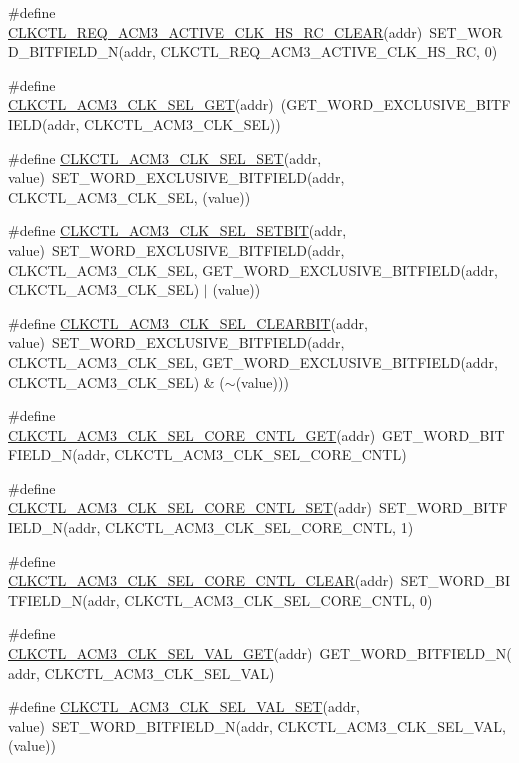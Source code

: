 \begin{DoxyCompactItemize}
\#define \hyperlink{a00544_a09d288add5f3f2bcd204e874b292084a}{CLKCTL\_\-REQ\_\-ACM3\_\-ACTIVE\_\-CLK\_\-HS\_\-RC\_\-CLEAR}(addr)~SET\_\-WORD\_\-BITFIELD\_\-N(addr, CLKCTL\_\-REQ\_\-ACM3\_\-ACTIVE\_\-CLK\_\-HS\_\-RC, 0)
\item 
\#define \hyperlink{a00544_a475e7d7345c6213e1e0074d4f1be33a5}{CLKCTL\_\-ACM3\_\-CLK\_\-SEL\_\-GET}(addr)~(GET\_\-WORD\_\-EXCLUSIVE\_\-BITFIELD(addr, CLKCTL\_\-ACM3\_\-CLK\_\-SEL))
\item 
\#define \hyperlink{a00544_a5db3846664ebb26bec7a6367928c72ad}{CLKCTL\_\-ACM3\_\-CLK\_\-SEL\_\-SET}(addr, value)~SET\_\-WORD\_\-EXCLUSIVE\_\-BITFIELD(addr, CLKCTL\_\-ACM3\_\-CLK\_\-SEL, (value))
\item 
\#define \hyperlink{a00544_aa5e0d7b946e296733391baac4cf7f70f}{CLKCTL\_\-ACM3\_\-CLK\_\-SEL\_\-SETBIT}(addr, value)~SET\_\-WORD\_\-EXCLUSIVE\_\-BITFIELD(addr, CLKCTL\_\-ACM3\_\-CLK\_\-SEL, GET\_\-WORD\_\-EXCLUSIVE\_\-BITFIELD(addr, CLKCTL\_\-ACM3\_\-CLK\_\-SEL) $|$ (value))
\item 
\#define \hyperlink{a00544_a07dac91bc32bc3f81ccb322bee4dfd0d}{CLKCTL\_\-ACM3\_\-CLK\_\-SEL\_\-CLEARBIT}(addr, value)~SET\_\-WORD\_\-EXCLUSIVE\_\-BITFIELD(addr, CLKCTL\_\-ACM3\_\-CLK\_\-SEL, GET\_\-WORD\_\-EXCLUSIVE\_\-BITFIELD(addr, CLKCTL\_\-ACM3\_\-CLK\_\-SEL) \& ($\sim$(value)))
\item 
\#define \hyperlink{a00544_a90d30141c0714f73c374ee1e77d4c05c}{CLKCTL\_\-ACM3\_\-CLK\_\-SEL\_\-CORE\_\-CNTL\_\-GET}(addr)~GET\_\-WORD\_\-BITFIELD\_\-N(addr, CLKCTL\_\-ACM3\_\-CLK\_\-SEL\_\-CORE\_\-CNTL)
\item 
\#define \hyperlink{a00544_a9f588c8d788e35b4337dbb11272ffa55}{CLKCTL\_\-ACM3\_\-CLK\_\-SEL\_\-CORE\_\-CNTL\_\-SET}(addr)~SET\_\-WORD\_\-BITFIELD\_\-N(addr, CLKCTL\_\-ACM3\_\-CLK\_\-SEL\_\-CORE\_\-CNTL, 1)
\item 
\#define \hyperlink{a00544_a3a8e6ee52972219615b61e8354e065bd}{CLKCTL\_\-ACM3\_\-CLK\_\-SEL\_\-CORE\_\-CNTL\_\-CLEAR}(addr)~SET\_\-WORD\_\-BITFIELD\_\-N(addr, CLKCTL\_\-ACM3\_\-CLK\_\-SEL\_\-CORE\_\-CNTL, 0)
\item 
\#define \hyperlink{a00544_afa6e29a06b1018092cf640d7c74c6810}{CLKCTL\_\-ACM3\_\-CLK\_\-SEL\_\-VAL\_\-GET}(addr)~GET\_\-WORD\_\-BITFIELD\_\-N(addr, CLKCTL\_\-ACM3\_\-CLK\_\-SEL\_\-VAL)
\item 
\#define \hyperlink{a00544_a0d6b754768ef43346aee79ff28f63e65}{CLKCTL\_\-ACM3\_\-CLK\_\-SEL\_\-VAL\_\-SET}(addr, value)~SET\_\-WORD\_\-BITFIELD\_\-N(addr, CLKCTL\_\-ACM3\_\-CLK\_\-SEL\_\-VAL, (value))
\item 

\end{DoxyCompactItemize}
